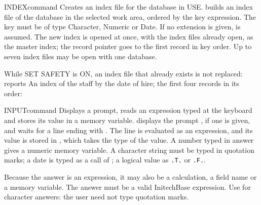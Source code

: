 \begin{XbaseEntry}{INDEX}{command}
Creates an index file for the database in USE.
\Syntax
{}
\Usage
{} builds an index file of the database in the selected work area,
ordered by the key expression.  The key must be of type Character, Numeric
or Date.  If no extension is given,  is assumed.  The new index is
opened at once, with the index files already open, as the master index; the
record pointer goes to the first record in key order.  Up to seven index
files may be open with one database.

While SET SAFETY is ON, an index file that already exists is not replaced:
 reports 
\Examples
An index of the staff by the date of hire; the first four records in its
order:
\end{XbaseEntry}

\begin{XbaseEntry}{INPUT}{command}
Displays a prompt, reads an expression typed at the keyboard and stores its
value in a memory variable.
\Syntax
{}
\Usage
{} displays the prompt , if one is given, and waits for a
line ending with .  The line is evaluated as an expression, and its
value is stored in , which takes the type of the value.  A number
typed in answer gives a numeric memory variable.  A character string must be
typed in quotation marks; a date is typed as a call of ; a logical
value as \texttt{.T.} or \texttt{.F.}.

Because the answer is an expression, it may also be a calculation, a field
name or a memory variable.  The answer must be a valid InitechBase
expression.
\Tips
Use  for character answers: the user need not type quotation
marks.
\Examples
{}
\end{XbaseEntry}

